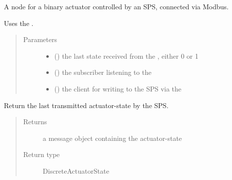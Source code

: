 \documentclass[a4paper,12pt,twoside]{article}
\begin{document}
\begin{fulllineitems}
\label{\detokenize{meso_control_pkg:meso_control_pkg.sps_binary_actuator_node.SpsBinaryActuator}}
A node for a binary actuator controlled by an SPS, connected via Modbus.

Uses the .
\begin{quote}\begin{description}
\item[{Parameters}] \leavevmode\begin{itemize}
\item {} 
 () \textendash{} the last state received from the , either 0 or 1

\item {} 
 () \textendash{} the subscriber listening to the 

\item {} 
 () \textendash{} the client for writing to the SPS via the 

\end{itemize}

\end{description}\end{quote}

\begin{fulllineitems}
\label{\detokenize{meso_control_pkg:meso_control_pkg.sps_binary_actuator_node.SpsBinaryActuator.poll_status}}
Return the last transmitted actuator-state by the SPS.
\begin{quote}\begin{description}
\item[{Returns}] \leavevmode
a message object containing the actuator-state

\item[{Return type}] \leavevmode
DiscreteActuatorState


\end{description}
\end{quote}
\end{fulllineitems}
\end{fulllineitems}
\end{document}
